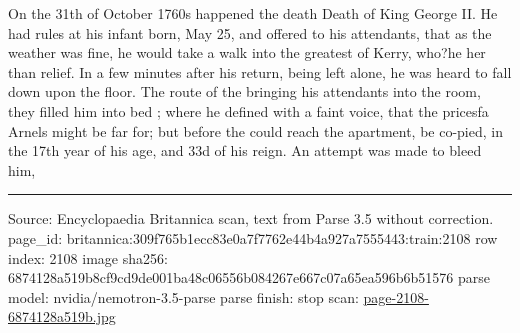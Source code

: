 \documentclass[10pt]{article}
\begin{document}
On the 31th of October 1760s happened the death Death of King George II. He had rules at his infant born, May 25, and offered to his attendants, that as the weather was fine, he would take a walk into the greatest of Kerry, who?he her than relief. In a few minutes after his return, being left alone, he was heard to fall down upon the floor. The route of the bringing his attendants into the room, they filled him into bed ; where he defined with a faint voice, that the pricesfa Arnels might be far for; but before the could reach the apartment, be co-pied, in the 17th year of his age, and 33d of his reign. An attempt was made to bleed him,

\vfill\par\noindent\rule{\linewidth}{0.4pt}\par
{\scriptsize\color{gray}\noindent Source: Encyclopaedia Britannica scan, text from Parse 3.5 without correction. page\_id: britannica:309f765b1ecc83e0a7f7762e44b4a927a7555443:train:2108 \quad row index: 2108 \quad image sha256: 6874128a519b8cf9cd9de001ba48c06556b084267e667c07a65ea596b6b51576 \quad parse model: nvidia/nemotron-3.5-parse \quad parse finish: stop \quad scan: \href{../scans/page-2108-6874128a519b.jpg}{page-2108-6874128a519b.jpg}\par}
\end{document}
